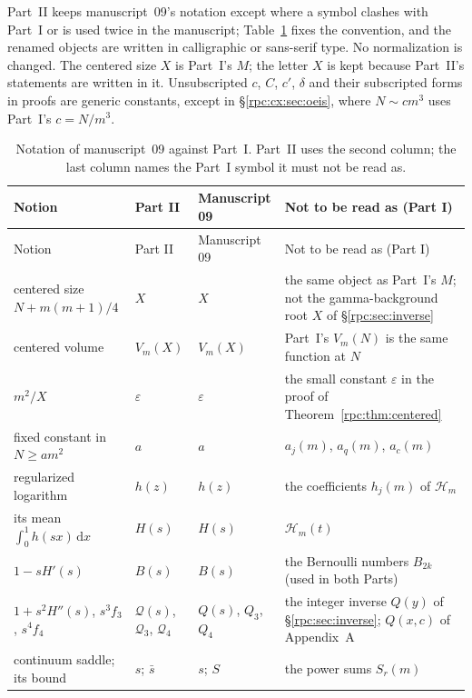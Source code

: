 \documentclass[11pt]{article}
\theoremstyle{definition}
\theoremstyle{remark}
\newcommand{\dd}{\,\mathrm d}
\numberwithin{equation}{section}
\begin{document}
Part~II keeps manuscript~09's notation except where a symbol clashes with
Part~I or is used twice in the manuscript; Table~\ref{rpc:cx:tab:dictionary}
fixes the convention, and the renamed objects are written in calligraphic
or sans-serif type. No normalization is changed. The centered size $X$ is
Part~I's $M$; the letter $X$ is kept because Part~II's statements are
written in it. Unsubscripted $c$, $C$, $c'$, $\delta$ and their subscripted
forms in proofs are generic constants, except in
\S\ref{rpc:cx:sec:oeis}, where $N\sim cm^3$ uses Part~I's $c=N/m^3$.

\begingroup\small
\renewcommand{\arraystretch}{1.12}
\begin{longtable}{@{}>{\raggedright\arraybackslash}p{}>{\raggedright\arraybackslash}p{}>{\raggedright\arraybackslash}p{}>{\raggedright\arraybackslash}p{}@{}}
\caption{Notation of manuscript~09 against Part~I. Part~II uses the second
column; the last column names the Part~I symbol it must not be read as.}
\label{rpc:cx:tab:dictionary}\\
\toprule
Notion & Part II & Manuscript 09 & Not to be read as (Part I)\\
\midrule
\endfirsthead
\toprule
Notion & Part II & Manuscript 09 & Not to be read as (Part I)\\
\midrule
\endhead
\bottomrule
\endfoot
centered size $N+m(m+1)/4$ & $X$ & $X$ & the same object as Part~I's $M$; not the gamma-background root $X$ of \S\ref{rpc:sec:inverse}\\
centered volume & $V_m(X)$ & $V_m(X)$ & Part~I's $V_m(N)$ is the same function at $N$\\
$m^2/X$ & $\varepsilon$ & $\varepsilon$ & the small constant $\varepsilon$ in the proof of Theorem~\ref{rpc:thm:centered}\\
fixed constant in $N\ge am^2$ & $a$ & $a$ & $a_j(m)$, $a_q(m)$, $a_c(m)$\\
regularized logarithm & $h(z)$ & $h(z)$ & the coefficients $h_j(m)$ of $\mathcal H_m$\\
its mean $\int_0^1h(sx)\dd x$ & $H(s)$ & $H(s)$ & $\mathcal H_m(t)$\\
$1-sH'(s)$ & $B(s)$ & $B(s)$ & the Bernoulli numbers $B_{2k}$ (used in both Parts)\\
$1+s^2H''(s)$, $s^3f_3$, $s^4f_4$ & $\mathcal Q(s)$, $\mathcal Q_3$, $\mathcal Q_4$ & $Q(s)$, $Q_3$, $Q_4$ & the integer inverse $Q(y)$ of \S\ref{rpc:sec:inverse}; $Q(x,c)$ of Appendix~A\\
continuum saddle; its bound & $s$; $\bar s$ & $s$; $S$ & the power sums $S_r(m)$\\

\end{longtable}
\end{document}
